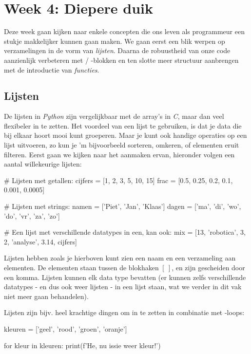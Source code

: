 \chapter{Week 4: Diepere duik}
Deze week gaan kijken naar enkele concepten die ons leven als programmeur een stukje makkelijker kunnen gaan maken. We gaan eerst een blik werpen op verzamelingen in de vorm van \textit{lijsten}. Daarna de robuustheid van onze code aanzienlijk verbeteren met  / -blokken en ten slotte meer structuur aanbrengen met de introductie van \textit{functies}. 

\section{Lijsten}
De lijsten in \textit{Python} zijn vergelijkbaar met de array's in \textit{C}, maar dan veel flexibeler in te zetten. Het voordeel van een lijst te gebruiken, is dat je data die bij elkaar hoort mooi kunt groeperen. Maar je kunt ook handige operaties op een lijst uitvoeren, zo kun je 'm bijvoorbeeld sorteren, omkeren, of elementen eruit filteren. Eerst gaan we kijken naar het aanmaken ervan, hieronder volgen een aantal willekeurige lijsten:

\begin{python}
# Lijsten met getallen:
cijfers = [1, 2, 3, 5, 10, 15] 
frac = [0.5, 0.25, 0.2, 0.1, 0.001, 0.0005] 

# Lijsten met strings:
namen = ['Piet', 'Jan', 'Klaas']
dagen = ['ma', 'di', 'wo', 'do', 'vr', 'za', 'zo']

# Een lijst met verschillende datatypes in een, kan ook:
mix = [13, 'robotica', 3, 2, 'analyse', 3.14, cijfers]
\end{python}

Lijsten hebben zoals je hierboven kunt zien een naam en een verzameling aan elementen. De elementen staan tussen de blokhaken $[\ ]$, en zijn gescheiden door een komma. Lijsten kunnen elk data type bevatten (er kunnen zelfs verschillende datatypes - en dus ook weer lijsten - in een lijst staan, wat we verder in dit vak niet meer gaan behandelen).

\newpage

Lijsten zijn bijv. heel krachtige dingen om in te zetten in combinatie met -loops:
\begin{python}
kleuren = ['geel', 'rood', 'groen', 'oranje']

for kleur in kleuren:
	print(f'He, nu issie weer {kleur}!')
\end{python}


